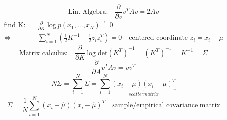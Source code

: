 \documentclass[11pt]{article}
\begin{document}
          \begin{equation*}
            \text{Lin. Algebra:} \quad \frac{\partial}{\partial v}v^TAv=2Av
          \end{equation*}
          \begin{equation*}
            \begin{align*}
              \text{find K:} \quad &\frac{\partial}{\partial K}
              \log p(x_1,...,x_N) \overset{!}{=}0 \\
              \iff &\sum_{i=1}^{N}(\frac{1}{2}K^{-1}-\frac{1}{2}z_iz_i^T)=0 \quad
              \text{centered coordinate } z_i=x_i-\mu
            \end{align*}
          \end{equation*}
          \begin{equation*}
            \text{Matrix calculus:} \quad \frac{\partial}{\partial K} \log\text{det}(K^T)^{-1}=(K^T)^{-1}=K^{-1}=\Sigma
          \end{equation*}
          \begin{equation*}
            \frac{\partial}{\partial A} v^TAv=vv^T
          \end{equation*}
          \begin{equation*}
            N\Sigma=\sum_{i=1}^{N}\Sigma=\sum_{i=1}^{N}\underbrace{(x_i-\mu)(x_i-\mu)^T}_{scatter matrix}
          \end{equation*}
          \begin{equation*}
            \Sigma=\frac{1}{N}\sum_{i=1}^{N}(x_i-\hat{\mu})(x_i-\hat{\mu})^T
            \quad \text{sample/empirical covariance matrix}
          \end{equation*}
\end{document}
